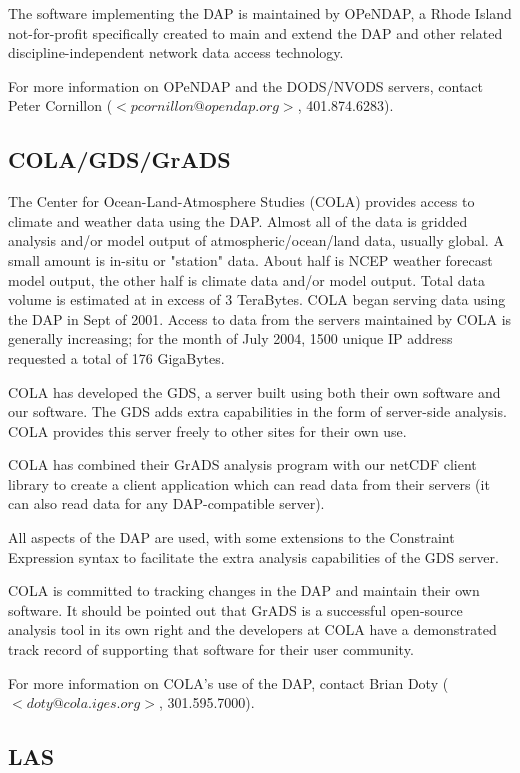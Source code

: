 \documentclass[justify]{dods-paper}
\begin{document}
The software implementing the DAP is maintained by OPeNDAP, a Rhode Island
not-for-profit specifically created to main and extend the DAP and other
related discipline-independent network data access technology.

For more information on OPeNDAP and the DODS/NVODS servers, contact Peter
Cornillon ($<pcornillon@opendap.org>$, 401.874.6283).

\subsection{COLA/GDS/GrADS}

The Center for Ocean-Land-Atmosphere Studies (COLA) provides access to
climate and weather data using the DAP. Almost all of the data is gridded
analysis and/or model output of atmospheric/ocean/land data, usually global.
A small amount is in-situ or "station" data. About half is NCEP weather
forecast model output, the other half is climate data and/or model output.
Total data volume is estimated at in excess of 3 TeraBytes. COLA began
serving data using the DAP in Sept of 2001. Access to data from the servers
maintained by COLA is generally increasing; for the month of July 2004, 1500
unique IP address requested a total of 176 GigaBytes.

COLA has developed the GDS, a server built using both their own software and
our software. The GDS adds extra capabilities in the form of server-side
analysis. COLA provides this server freely to other sites for their own use.

COLA has combined their GrADS analysis program with our netCDF
client library to create a client application which can read data from their
servers (it can also read data for any DAP-compatible server). 

All aspects of the DAP are used, with some extensions to the Constraint
Expression syntax to facilitate the extra analysis capabilities of the GDS
server. 

COLA is committed to tracking changes in the DAP and maintain their own
software. It should be pointed out that GrADS is a successful open-source
analysis tool in its own right and the developers at COLA have a demonstrated
track record of supporting that software for their user community.

For more information on COLA's use of the DAP, contact Brian Doty
($<doty@cola.iges.org>$, 301.595.7000).

\subsection{LAS}
\end{document}
